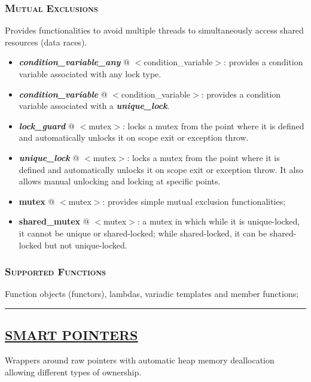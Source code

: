 \documentclass[10pt]{article}
\begin{document}
\begin{multicols*}{5}
{\subsubsection*{\textsc{Mutual Exclusions}}
\noindent
Provides functionalities to avoid multiple threads to simultaneously access shared resources (data races).
\begin{itemize}[leftmargin=*,topsep=0.25pt]
  \setlength\itemsep{-1.8pt}
	\item  {\emph{\textbf{condition\_variable\_any}}} @ $<$condition\_variable$>$: provides a condition variable associated with any lock type.
	\item  {\emph{\textbf{condition\_variable}}} @ $<$condition\_variable$>$: provides a condition variable associated with a \emph{\textbf{unique\_lock}}.
	\item  {\emph{\textbf{lock\_guard}}} @ $<$mutex$>$: locks a mutex from the point where it is defined and automatically unlocks it on scope exit or exception throw.
	\item  {\emph{\textbf{unique\_lock}}} @ $<$mutex$>$: locks a mutex from the point where it is defined and automatically unlocks it on scope exit or exception throw. It also allows manual unlocking and locking at specific points.
	\item  {\textbf{mutex}} @ $<$mutex$>$: provides simple mutual exclusion functionalities;
	\item  {\textbf{shared\_mutex}} @ $<$mutex$>$: a mutex in which while it is unique-locked, it cannot be unique or shared-locked; while shared-locked, it can be shared-locked but not unique-locked.
\end{itemize}

\subsubsection*{\textsc{Supported Functions}} 
\noindent
Function objects (functors), lambdas, variadic templates and member functions; 

}

\par\noindent\rule{155pt}{0.4pt}


{\color{Blue}
\subsection*{\href{https://en.cppreference.com/w/cpp/memory}{\underline{SMART POINTERS}}}	
\noindent
Wrappers around raw pointers with automatic heap memory deallocation allowing different types of ownership.

}
\end{multicols*}
\end{document}
